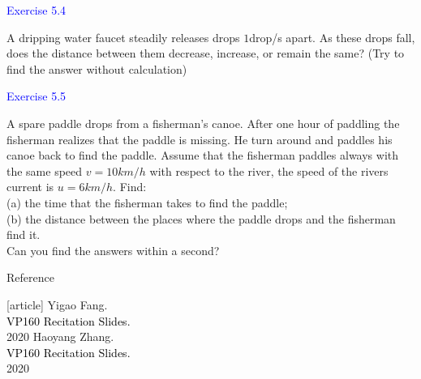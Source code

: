 \documentclass{beamer}
\begin{document}
\begin{frame}
\textcolor{blue}{Exercise 5.4}

A dripping water faucet steadily releases drops $1$drop/s apart. As
these drops fall, does the distance between them decrease, increase,
or remain the same? (Try to find the answer without calculation)
\end{frame}

\begin{frame}
\textcolor{blue}{Exercise 5.5}

A spare paddle drops from a fisherman’s canoe. After one hour
of paddling the fisherman realizes that the paddle is missing.
He turn around and paddles his canoe back to find the paddle.
Assume that the fisherman paddles always with the same speed
$v = 10km/h$ with respect to the river, the speed of the rivers
current is $u = 6km/h$. Find:\\
(a) the time that the fisherman takes to find the paddle;\\
(b) the distance between the places where the paddle drops and
the fisherman find it.\\
Can you find the answers within a second?
\end{frame}

\begin{frame}{Reference}
  \begin{thebibliography}{9}
  [article]
   Yigao Fang.\\
  \textcolor{black}{VP160 Recitation Slides.}\\
  2020
   Haoyang Zhang.\\
  \textcolor{black}{VP160 Recitation Slides.}\\
  2020
  \end{thebibliography}
  \end{frame}

  
\end{document}
